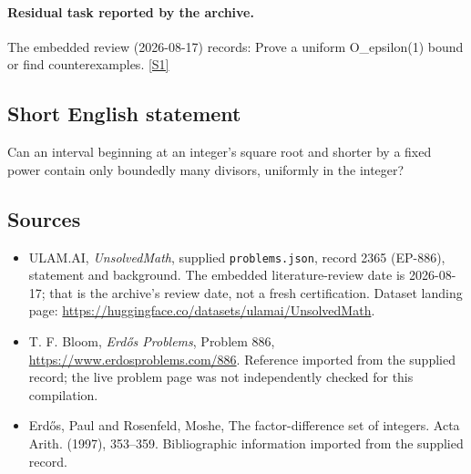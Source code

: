 \documentclass[11pt,a4paper]{article}
\newcommand{\sref}[2]{\hyperlink{source:#1:#2}{[S#2]}}
\begin{document}
\paragraph{Residual task reported by the archive.}

The embedded review (2026-08-17) records: Prove a uniform O\_epsilon(1) bound or find counterexamples. \sref{2365}{1}

\subsection{Short English statement}

Can an interval beginning at an integer's square root and shorter by a fixed power contain only boundedly many divisors, uniformly in the integer?

\subsection{Sources}

{\small

\begin{itemize}

\item[\hypertarget{source:2365:1}{S1}] ULAM.AI, \emph{UnsolvedMath}, supplied \texttt{problems.json}, record 2365 (EP-886), statement and background. The embedded literature-review date is 2026-08-17; that is the archive’s review date, not a fresh certification. Dataset landing page: \url{https://huggingface.co/datasets/ulamai/UnsolvedMath}.

\item[\hypertarget{source:2365:2}{S2}] T. F. Bloom, \emph{Erdős Problems}, Problem 886, \url{https://www.erdosproblems.com/886}. Reference imported from the supplied record; the live problem page was not independently checked for this compilation.

\item[\hypertarget{source:2365:3}{S3}] Erd\H{o}s, Paul and Rosenfeld, Moshe, The factor-difference set of integers. Acta Arith. (1997), 353--359. Bibliographic information imported from the supplied record.

\end{itemize}

}

\label{end:2365}
\end{document}
